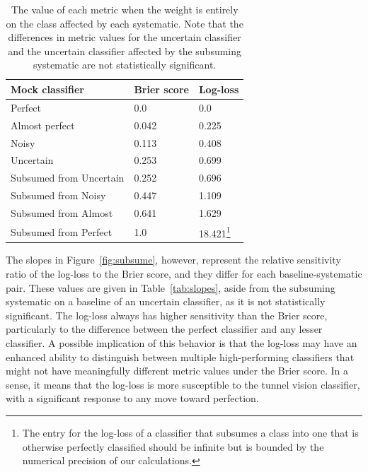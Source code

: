 \begin{table}[]
\begin{tabular}{lll}
Mock classifier & Brier score & Log-loss\\
\hline
Perfect & 0.0 & 0.0\\
Almost perfect & 0.042 & 0.225\\
Noisy & 0.113 & 0.408\\
Uncertain & 0.253 & 0.699\\
Subsumed from Uncertain & 0.252 & 0.696\\
Subsumed from Noisy & 0.447 & 1.109\\
Subsumed from Almost & 0.641 & 1.629\\
Subsumed from Perfect & 1.0 & 18.421\footnote{The entry for the log-loss of a classifier that subsumes a class into one that is otherwise perfectly classified should be infinite but is bounded by the numerical precision of our calculations.}
\end{tabular}
\caption{The value of each metric when the weight is entirely on the class affected by each systematic.
Note that the differences in metric values for the uncertain classifier and the uncertain classifier affected by the subsuming systematic are not statistically significant.}
\label{tab:extents}
\end{table}

The slopes in Figure~\ref{fig:subsume}, however, represent the relative sensitivity ratio of the log-loss to the Brier score, and they differ for each baseline-systematic pair.
These values are given in Table~\ref{tab:slopes}, aside from the subsuming systematic on a baseline of an uncertain classifier, as it is not statistically significant.
The log-loss always has higher sensitivity than the Brier score, particularly to the difference between the perfect classifier and any lesser classifier.
A possible implication of this behavior is that the log-loss may have an enhanced ability to distinguish between multiple high-performing classifiers that might not have meaningfully different metric values under the Brier score.
In a sense, it means that the log-loss is more susceptible to the tunnel vision classifier, with a significant response to any move toward perfection.

